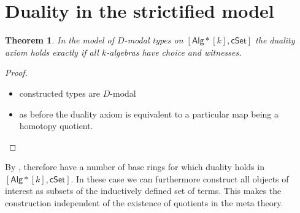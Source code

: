 \documentclass[10pt,a4paper]{article}
\newtheorem{theorem}{Theorem}[section]
\newcommand{\Set}{\mathsf{Set}}
\newcommand{\cSet}{\mathsf{cSet}}
\newcommand{\Alg}{\mathsf{Alg}}
\newcommand\Ty{\mathsf{Ty}}
\begin{document}
\section{Duality in the strictified model}\label{sec:duality-in-model-of-modal-types}




\begin{theorem}
  In the model of \(D\)-modal types on \([\Alg*[k], \cSet]\) the duality axiom holds exactly if all \(k\)-algebras have choice and witnesses.
\end{theorem}
\begin{proof}
  \begin{itemize}
    \item constructed types are \(D\)-modal 
    \item as before the duality axiom is equivalent to a particular map being a homotopy quotient.
  \end{itemize}



\end{proof}

By , therefore have a number of base rings for which duality holds in \([\Alg*[k], \cSet]\).
In these case we can furthermore construct all objects of interest as subsets of the inductively defined set of terms.
This makes the construction independent of the existence of quotients in the meta theory.




\end{document}
